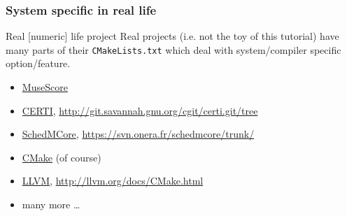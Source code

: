 \documentclass[compress,slidestop,table
              ]
               {beamer}
\newcommand{\fname}[1]{\texttt{#1}}
\begin{document}
\begin{frame}[fragile]
\frametitle{System specific in real life}
\begin{block}{Real [numeric] life project}
Real projects (i.e. not the toy of this tutorial) have many parts
of their \fname{CMakeLists.txt} which deal with system/compiler
specific option/feature.
\end{block}
\begin{itemize}
\item \href{http://musescore.org}{MuseScore}
\item \href{https://savannah.nongnu.org/projects/certi/}{CERTI},
{\scriptsize \url{http://git.savannah.gnu.org/cgit/certi.git/tree}}
\item \href{https://forge.onera.fr/projects/schedmcore}{SchedMCore},
{\scriptsize \url{https://svn.onera.fr/schedmcore/trunk/}}
\item \href{http://cmake.org}{CMake} (of course)
\item \href{http://llvm.org}{LLVM}, {\scriptsize \url{http://llvm.org/docs/CMake.html}}
\item many more \ldots
\end{itemize}
\end{frame}
\end{document}
